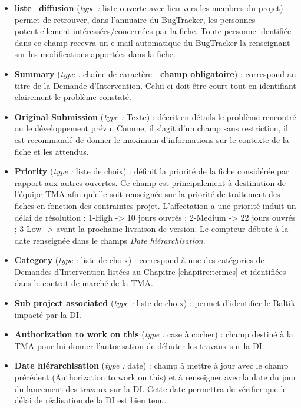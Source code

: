 \begin{itemize}[label=$\Rightarrow$, font=\LARGE]
   \item \textbf{liste\_diffusion} (\textit{type :} liste ouverte avec lien vers les membres du projet) : permet de retrouver, dans l'annuaire du BugTracker, les personnes potentiellement intéressées/concernées par la fiche. Toute personne identifiée dans ce champ recevra un e-mail automatique du BugTracker la renseignant sur les modifications apportées dans la fiche.
   \item \textbf{Summary} (\textit{type :} chaîne de caractère - \textbf{champ obligatoire}) : correspond au titre de la Demande d'Intervention. Celui-ci doit être court tout en identifiant clairement le problème constaté.  
   \item \textbf{Original Submission} (\textit{type :} Texte) : décrit en détails le problème rencontré ou le développement prévu. Comme, il s'agit d'un champ sans restriction, il est recommandé de donner le maximum d'informations sur le contexte de la fiche et les attendus.
   \item \textbf{Priority} (\textit{type :} liste de choix) : définit la priorité de la fiche considérée par rapport aux autres ouvertes. Ce champ est principalement à destination de l'équipe TMA afin qu'elle soit renseignée sur la priorité de traitement des fiches en fonction des contraintes projet. L'affectation a une priorité induit un délai de résolution : 1-High -> 10 jours ouvrés ; 2-Medium -> 22 jours ouvrés ; 3-Low -> avant la prochaine livraison de version. Le compteur débute à la date renseignée dans le champs \textit{Date hiérarchisation}.
   \item \textbf{Category} (\textit{type :} liste de choix) : correspond à une des catégories de Demandes d'Intervention listées au Chapitre \ref{chapitre:termes} et identifiées dans le contrat de marché de la TMA.
   \item \textbf{Sub project associated} (\textit{type :} liste de choix) : permet d'identifier le Baltik impacté par la DI.
   \item \textbf{Authorization to work on this} (\textit{type :} case à cocher) : champ destiné à la TMA pour lui donner l'autorisation de débuter les travaux sur la DI.
   \item \textbf{Date hiérarchisation} (\textit{type :} date) : champ à mettre à jour avec le champ précédent (Authorization to work on this) et à renseigner avec la date du jour du lancement des travaux sur la DI. Cette date permettra de vérifier que le délai de réalisation de la DI est bien tenu.

\end{itemize}
